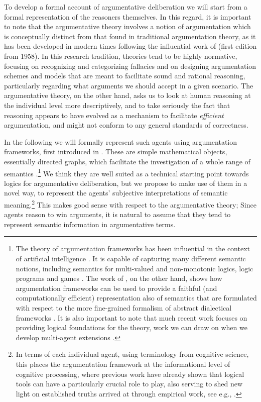 \documentclass[greybox]{svmult}
\begin{document}
To develop a formal account of argumentative deliberation we will start from a formal representation of the reasoners themselves. In this regard, it is important to note that the argumentative theory involves a notion of argumentation which is conceptually distinct from that found in traditional argumentation theory, as it has been developed in modern times following the influential work of \cite{toulmin} (first edition from 1958). In this research tradition, theories  tend to be highly normative, focusing on recognizing and categorizing fallacies and on designing argumentation schemes and models that are meant to facilitate sound and rational reasoning, particularly regarding what arguments we should accept in a given scenario. The argumentative theory, on the other hand, asks us to look at human reasoning at the individual level more descriptively, and to take seriously the fact that reasoning appears to have evolved as a mechanism to facilitate \emph{efficient} argumentation, and might not conform to any general standards of correctness.

In the following we will formally represent such agents using argumentation frameworks, first introduced in \cite{dung}. These are simple mathematical objects, essentially directed graphs, which facilitate the investigation of a whole range of semantics \cite{baroni}.\footnote{The theory of argumentation frameworks has been influential in the context of artificial intelligence \cite{rahwan}. It is capable of capturing many different semantic notions, including semantics for multi-valued and non-monotonic logics, logic programs and games \cite{dung,dyrkolbotn}. The work of \cite{brewka}, on the other hand, shows how argumentation frameworks can be used to provide a faithful (and computationally efficient) representation also of semantics that are formulated with respect to the more fine-grained formalism of abstract dialectical frameworks \cite{brewka1}. It is also important to note that much recent work focuses on providing logical foundations for the theory, work we can draw on when we develop multi-agent extensions  \cite{grossi,grossi1,arieli,caminada}.} We think they are well suited as a technical starting point towards logics for argumentative deliberation, but we propose to make use of them in a novel way, to represent the agents' subjective interpretations of semantic meaning.\footnote{In terms of each individual agent, using terminology from cognitive science, this places the argumentation framework at the informational level of cognitive processing, where previous work have already shown that logical tools can have a particularly crucial role to play, also serving to shed new light on established truths arrived at through empirical work, see e.g., \cite{stenning}.} This makes good sense with respect to the argumentative theory; Since agents reason to win arguments, it is natural to assume that they tend to represent semantic information in argumentative terms.
\end{document}

